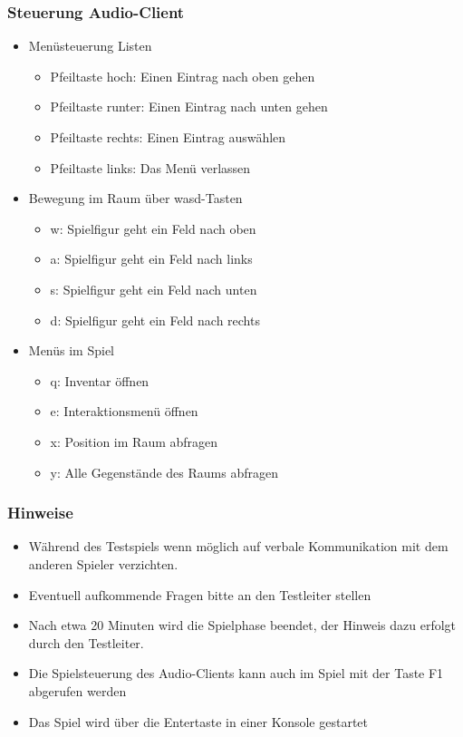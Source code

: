 \subsubsection*{Steuerung Audio-Client}
\begin{itemize}
\item{}Menüsteuerung Listen
	\begin{itemize}
	\item{}Pfeiltaste hoch: Einen Eintrag nach oben gehen
	\item{}Pfeiltaste runter: Einen Eintrag nach unten gehen
	\item{}Pfeiltaste rechts: Einen Eintrag auswählen
	\item{}Pfeiltaste links: Das Menü verlassen
	\end{itemize}
\item{}Bewegung im Raum über wasd-Tasten
	\begin{itemize}
	\item{}w: Spielfigur geht ein Feld nach oben
	\item{}a: Spielfigur geht ein Feld nach links
	\item{}s: Spielfigur geht ein Feld nach unten
	\item{}d: Spielfigur geht ein Feld nach rechts
	\end{itemize}
\item{}Menüs im Spiel
	\begin{itemize}
	\item{}q: Inventar öffnen
	\item{}e: Interaktionsmenü öffnen
	\item{}x: Position im Raum abfragen
	\item{}y: Alle Gegenstände des Raums abfragen
	\end{itemize}
\end{itemize}

\subsubsection*{Hinweise}

\begin{itemize}
\item{}Während des Testspiels wenn möglich auf verbale Kommunikation mit dem anderen Spieler verzichten.
\item{}Eventuell aufkommende Fragen bitte an den Testleiter stellen
\item{}Nach etwa 20 Minuten wird die Spielphase beendet, der Hinweis
dazu erfolgt durch den Testleiter.
\item{}Die Spielsteuerung des Audio-Clients kann auch im Spiel mit der Taste F1 abgerufen werden
\item{}Das Spiel wird über die Entertaste in einer Konsole gestartet
\end{itemize}